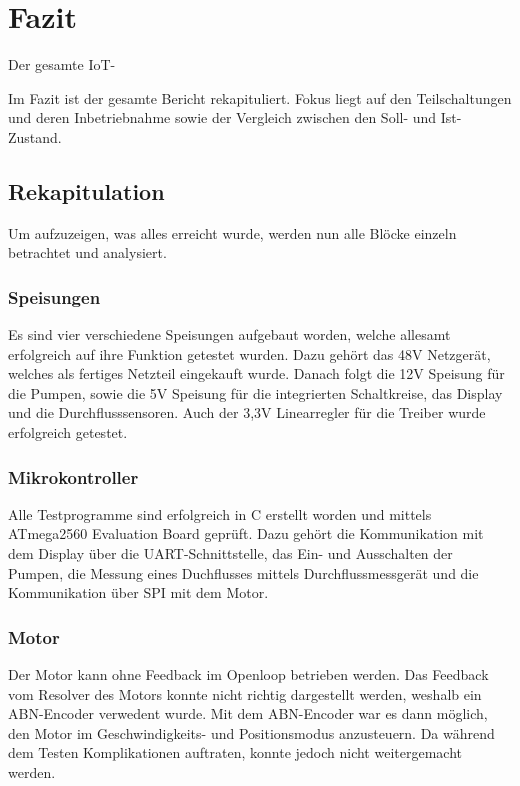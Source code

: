 \clearpage
\section{Fazit}
\label{sec:Fazit}

Der gesamte IoT-

Im Fazit ist der gesamte Bericht rekapituliert. Fokus liegt auf den Teilschaltungen und deren Inbetriebnahme sowie der Vergleich zwischen den Soll- und Ist-Zustand.

\subsection{Rekapitulation}
\label{subsec:Was_wurde_erreicht_und_was_nicht}

Um aufzuzeigen, was alles erreicht wurde, werden nun alle Blöcke einzeln betrachtet und analysiert.

\subsubsection{Speisungen}
\label{subsubsec:Fazit_Speisungen}

Es sind vier verschiedene Speisungen aufgebaut worden, welche allesamt erfolgreich auf ihre Funktion getestet wurden. Dazu gehört das 48V Netzgerät, welches als fertiges Netzteil eingekauft wurde. Danach folgt die 12V Speisung für die Pumpen, sowie die 5V Speisung für die integrierten Schaltkreise, das Display und die Durchflusssensoren. Auch der 3,3V Linearregler für die Treiber wurde erfolgreich getestet. 

\subsubsection{Mikrokontroller}
\label{subsubsec:Fazit_Mikrokontroller}

Alle Testprogramme sind erfolgreich in C erstellt worden und mittels ATmega2560 Evaluation Board geprüft. Dazu gehört die Kommunikation mit dem Display über die UART-Schnittstelle, das Ein- und Ausschalten der Pumpen, die Messung eines Duchflusses mittels Durchflussmessgerät und die Kommunikation über SPI mit dem Motor.

\subsubsection{Motor}
\label{subsubsec:Fazit_Motor}

Der Motor kann ohne Feedback im Openloop betrieben werden. Das Feedback vom Resolver des Motors konnte nicht richtig dargestellt werden, weshalb ein ABN-Encoder verwedent wurde. Mit dem ABN-Encoder war es dann möglich, den Motor im Geschwindigkeits- und Positionsmodus anzusteuern. Da während dem Testen Komplikationen auftraten, konnte jedoch nicht weitergemacht werden.

